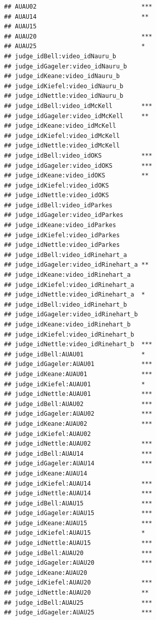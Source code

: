 \documentclass{monashthesis}
\begin{document}
\begin{verbatim}
## AUAU02                             ***
## AUAU14                             ** 
## AUAU15                                
## AUAU20                             ***
## AUAU25                             *  
## judge_idBell:video_idNauru_b          
## judge_idGageler:video_idNauru_b       
## judge_idKeane:video_idNauru_b         
## judge_idKiefel:video_idNauru_b        
## judge_idNettle:video_idNauru_b        
## judge_idBell:video_idMcKell        ***
## judge_idGageler:video_idMcKell     ** 
## judge_idKeane:video_idMcKell          
## judge_idKiefel:video_idMcKell         
## judge_idNettle:video_idMcKell         
## judge_idBell:video_idOKS           ***
## judge_idGageler:video_idOKS        ***
## judge_idKeane:video_idOKS          ** 
## judge_idKiefel:video_idOKS            
## judge_idNettle:video_idOKS            
## judge_idBell:video_idParkes           
## judge_idGageler:video_idParkes        
## judge_idKeane:video_idParkes          
## judge_idKiefel:video_idParkes         
## judge_idNettle:video_idParkes         
## judge_idBell:video_idRinehart_a       
## judge_idGageler:video_idRinehart_a ** 
## judge_idKeane:video_idRinehart_a      
## judge_idKiefel:video_idRinehart_a     
## judge_idNettle:video_idRinehart_a  *  
## judge_idBell:video_idRinehart_b       
## judge_idGageler:video_idRinehart_b    
## judge_idKeane:video_idRinehart_b      
## judge_idKiefel:video_idRinehart_b     
## judge_idNettle:video_idRinehart_b  ***
## judge_idBell:AUAU01                *  
## judge_idGageler:AUAU01             ***
## judge_idKeane:AUAU01               ***
## judge_idKiefel:AUAU01              *  
## judge_idNettle:AUAU01              ***
## judge_idBell:AUAU02                ***
## judge_idGageler:AUAU02             ***
## judge_idKeane:AUAU02               ***
## judge_idKiefel:AUAU02                 
## judge_idNettle:AUAU02              ***
## judge_idBell:AUAU14                ***
## judge_idGageler:AUAU14             ***
## judge_idKeane:AUAU14                  
## judge_idKiefel:AUAU14              ***
## judge_idNettle:AUAU14              ***
## judge_idBell:AUAU15                ***
## judge_idGageler:AUAU15             ***
## judge_idKeane:AUAU15               ***
## judge_idKiefel:AUAU15              *  
## judge_idNettle:AUAU15              ***
## judge_idBell:AUAU20                ***
## judge_idGageler:AUAU20             ***
## judge_idKeane:AUAU20                  
## judge_idKiefel:AUAU20              ***
## judge_idNettle:AUAU20              ** 
## judge_idBell:AUAU25                ***
## judge_idGageler:AUAU25             ***

\end{verbatim}
\end{document}
